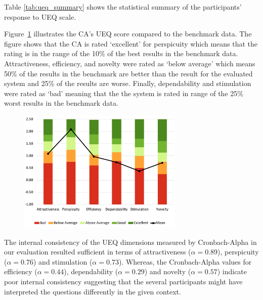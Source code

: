         Table \ref{tab:ueq_summary} shows the statistical summary of the participants' response to \ac{UEQ} scale.
        
        
        
        
        
        Figure~\ref{fig:ueq-benchmark} illustrates the \ac{CA}'s \ac{UEQ} score compared to the benchmark data. The figure shows that the \ac{CA} is rated `excellent' for perspicuity which means that the rating is in the range of the 10\% of the best results in the benchmark data. Attractiveness, efficiency, and novelty were rated as `below average' which means 50\% of the results in the benchmark are better than the result for the evaluated system and 25\% of the results are worse. Finally, dependability and stimulation were rated as `bad' meaning that the the system is rated in range of the 25\% worst results in the benchmark data.
        \begin{figure}
            \centering
            \includegraphics[width=0.7\textwidth]{figures/ueq-benchmark.pdf}
            \label{fig:ueq-benchmark}
        \end{figure}
        
        
        The internal consistency of the \ac{UEQ} dimensions measured by Cronbach-Alpha in our evaluation resulted sufficient in terms of attractiveness ($\alpha = 0.89$), perspicuity ($\alpha = 0.76$) and stimulation ($\alpha = 0.73$). Whereas, the Cronbach-Alpha values for efficiency ($\alpha = 0.44$), dependability ($\alpha = 0.29$) and novelty ($\alpha = 0.57$) indicate poor internal consistency suggesting that the several participants might have interpreted the questions differently in the given context.
            
            
        
            
        

        

        




